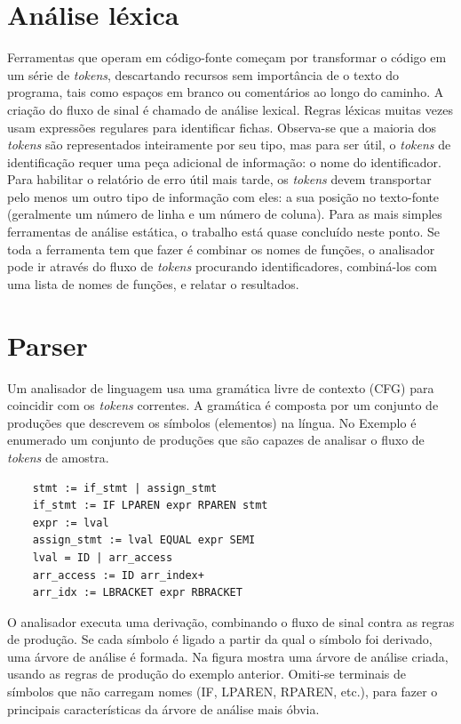 	\section {Análise léxica}
	
	Ferramentas que operam em código-fonte começam por transformar o código em um série de {\it tokens}, descartando recursos sem importância de o texto do programa, tais como espaços em branco ou comentários ao longo do caminho. A criação do fluxo de sinal é chamado de análise lexical. Regras léxicas muitas vezes usam expressões regulares para identificar fichas.
	Observa-se que a maioria dos {\it tokens} são representados inteiramente por seu tipo, mas para ser útil, o {\it tokens} de identificação requer uma peça adicional de informação: o nome do identificador. Para habilitar o relatório de erro útil mais tarde, os {\it tokens} devem transportar pelo menos um outro tipo de informação com eles: a sua posição no texto-fonte (geralmente um número de linha e um número de coluna). Para as mais simples ferramentas de análise estática, o trabalho está quase concluído neste ponto. Se toda a ferramenta tem que fazer é combinar os nomes de funções, o analisador pode ir através do fluxo de {\it tokens} procurando identificadores, combiná-los com uma lista de nomes de funções, e relatar o resultados.\\
	
	\section{Parser}
	
	Um analisador de linguagem usa uma gramática livre de contexto (CFG) para coincidir com os {\it tokens} correntes. A gramática é composta por um conjunto de produções que descrevem os símbolos (elementos) na língua. No Exemplo é enumerado um conjunto de produções que são capazes de analisar o fluxo de {\it tokens} de amostra.
	
	\begin{lstlisting}
	stmt := if_stmt | assign_stmt
	if_stmt := IF LPAREN expr RPAREN stmt
	expr := lval
	assign_stmt := lval EQUAL expr SEMI
	lval = ID | arr_access
	arr_access := ID arr_index+
	arr_idx := LBRACKET expr RBRACKET
	\end{lstlisting}
	
	O analisador executa uma derivação, combinando o fluxo de sinal contra as regras de produção. Se cada símbolo é ligado a partir da qual o símbolo foi derivado, uma árvore de análise é formada. Na figura mostra uma árvore de análise criada, usando as regras de produção do exemplo anterior. Omiti-se terminais de símbolos que não carregam nomes (IF, LPAREN, RPAREN, etc.), para fazer o principais características da árvore de análise mais óbvia.\\
	
